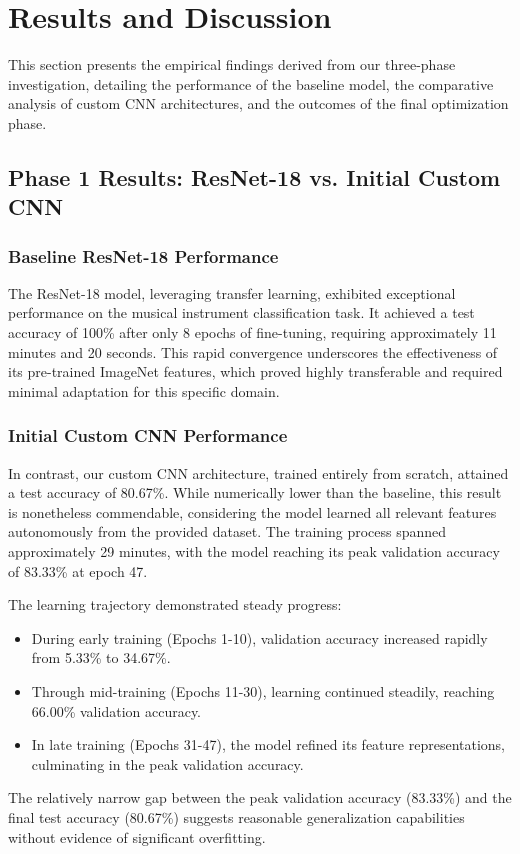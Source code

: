 
\section{Results and Discussion}
This section presents the empirical findings derived from our three-phase investigation, detailing the performance of the baseline model, the comparative analysis of custom CNN architectures, and the outcomes of the final optimization phase.

\subsection{Phase 1 Results: ResNet-18 vs. Initial Custom CNN}

\subsubsection{Baseline ResNet-18 Performance}
The ResNet-18 model, leveraging transfer learning, exhibited exceptional performance on the musical instrument classification task. It achieved a test accuracy of 100\% after only 8 epochs of fine-tuning, requiring approximately 11 minutes and 20 seconds. This rapid convergence underscores the effectiveness of its pre-trained ImageNet features, which proved highly transferable and required minimal adaptation for this specific domain.

\subsubsection{Initial Custom CNN Performance}
In contrast, our custom CNN architecture, trained entirely from scratch, attained a test accuracy of 80.67\%. While numerically lower than the baseline, this result is nonetheless commendable, considering the model learned all relevant features autonomously from the provided dataset. The training process spanned approximately 29 minutes, with the model reaching its peak validation accuracy of 83.33\% at epoch 47.

The learning trajectory demonstrated steady progress:
\begin{itemize}
    \item During early training (Epochs 1-10), validation accuracy increased rapidly from 5.33\% to 34.67\%.
    \item Through mid-training (Epochs 11-30), learning continued steadily, reaching 66.00\% validation accuracy.
    \item In late training (Epochs 31-47), the model refined its feature representations, culminating in the peak validation accuracy.
\end{itemize}
The relatively narrow gap between the peak validation accuracy (83.33\%) and the final test accuracy (80.67\%) suggests reasonable generalization capabilities without evidence of significant overfitting.

